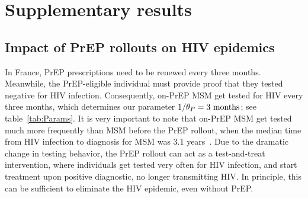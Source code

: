 \documentclass[11pt]{article}
\begin{document}
\section{Supplementary results}

\subsection{Impact of PrEP rollouts on HIV epidemics}

In France, PrEP prescriptions need to be renewed every three months.\cite{CNSANRS2018} Meanwhile, the PrEP-eligible individual must provide proof that they tested negative for HIV infection. Consequently, on-PrEP MSM get tested for HIV every three months, which determines our parameter $1/\theta_P=3~{\rm months}$; see table~\ref{tab:Params}. It is very important to note that on-PrEP MSM get tested much more frequently than MSM before the PrEP rollout, when the median time from HIV infection to diagnosis for MSM was 3.1 years~\cite{Marty2019}. Due to the dramatic change in testing behavior, the PrEP rollout can act as a test-and-treat intervention, where individuals get tested very often for HIV infection, and start treatment upon positive diagnostic, no longer transmitting HIV. In principle, this can be sufficient to eliminate the HIV epidemic, even without PrEP. \cite{Kretzschmar2013,WHO2016} 
\end{document}
